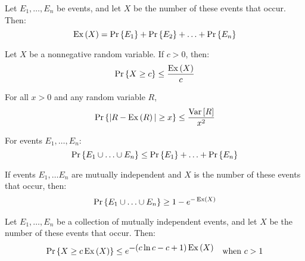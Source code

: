 \documentclass[12pt]{article}
\newcommand{\var}[1]{\Var\left[#1\right]}
\begin{document}
\newcommand{\prsub}[2]{\mathop{\textup{Pr}_{#1}}\nolimits\left(#2\right)}



\begin{theorem}
\label{th:num-events}
Let $E_1, \ldots, E_n$ be events, and let $X$ be the number of these
events that occur. Then:
%
\[
\operatorname{Ex}\left(X\right) = \mathop{\textup{Pr}}\nolimits\left\{E_1\right\} + \mathop{\textup{Pr}}\nolimits\left\{E_2\right\} + \ldots + \mathop{\textup{Pr}}\nolimits\left\{E_n\right\}
\]
\end{theorem}

\begin{theorem}
\label{th:markov}
Let $X$ be a nonnegative random variable.  If $c > 0$, then:
%
\[
\mathop{\textup{Pr}}\nolimits\left\{X \geq c\right\} \leq \frac{\operatorname{Ex}\left(X\right)}{c}
\]
\end{theorem}

\begin{theorem}
\label{th:chebyshev}
For all $x > 0$ and any random variable $R$,
$$\pr{|R-\ex{R}| \geq x} \leq \frac{\var{R}}{x^2}$$
\end{theorem}

\begin{theorem}
\label{th:union}
For events $E_1, \ldots, E_n$:
%
\[
\mathop{\textup{Pr}}\nolimits\left\{E_1 \cup \ldots \cup E_n\right\} \leq \mathop{\textup{Pr}}\nolimits\left\{E_1\right\} + \ldots + \mathop{\textup{Pr}}\nolimits\left\{E_n\right\}
\]
\end{theorem}

\begin{theorem}
\label{th:murphy}
If events $E_1, \ldots E_n$ are mutually independent and $X$ is the
number of these events that occur, then:
%
\[
\mathop{\textup{Pr}}\nolimits\left\{E_1 \cup \ldots \cup E_n\right\} \geq 1 - e^{-\operatorname{Ex}\left(X\right)}
\]
\end{theorem}

\begin{theorem}
\label{th:chernoff}
Let $E_1, \ldots, E_n$ be a collection of mutually independent events,
and let $X$ be the number of these events that occur.  Then:
%
\begin{align*}
\mathop{\textup{Pr}}\nolimits\left\{X \geq c \operatorname{Ex}\left(X\right)\right\} & \leq e^{\textstyle -(c \ln c - c + 1) \operatorname{Ex}\left(X\right)}
    & \text{when $c > 1$}
\end{align*}
\end{theorem}

\end{document}
